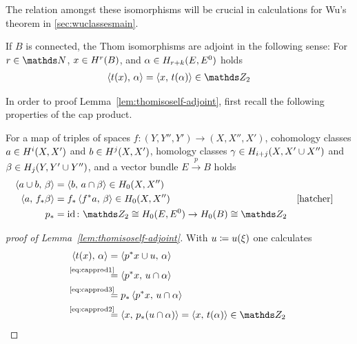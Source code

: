The relation amongst these isomorphisms will be crucial in
calculations for Wu's theorem in \autoref{sec:wuclassesmain}.
\begin{Lem}\label{lem:thomisoself-adjoint}
  If $B$ is connected, the Thom isomorphisms are adjoint in the
  following sense:
  For $r\in\Nat$, $x\in H^r(B)$,
  and $\alpha\in H_{r+k}(E, {E}^0)$  holds 
  \begin{gather*}
    \capped{t(x)}{\alpha} = \capped{x}{t(\alpha)} \in\Zmod2
  \end{gather*}
\end{Lem}
In order to proof Lemma~\ref{lem:thomisoself-adjoint},
first recall the following properties of the cap product.
\begin{Rem}
  For
  a map of triples of spaces
  $f\colon (Y,Y'',Y')\to (X,X'',X')$,
  cohomology classes
  $a\in H^i(X,X')$ and $b\in H^j(X,X')$,
  homology classes
  $\gamma\in H_{i+j}(X, X'\cup X'')$
  and
  $\beta\in H_j(Y, Y'\cup Y'')$,
  and a vector bundle $E\xrightarrow{p}B$
  holds
  \begin{align}
    \label{eq:capprod1}
    \capped{a\cup b}{\beta} &= \capped{b}{a\cap\beta}
                              \in \H_0(X,X'')\\
    \label{eq:capprod2}
    \capped{a}{\pf f \beta} &= \pf f \capped{\pb f a}{\beta}
                              \in \H_0(X,X'')
                            &&\text{\cite[Chap.~3.3.2, p.\,241]{hatcher}}\\
    \label{eq:capprod3}
    \pf p &= \Id \colon
    \Zmod2\cong \H_0(\thomspacepair{E})\to \H_0(B)\cong\Zmod2
  \end{align}
\end{Rem}
\begin{proof}[proof of Lemma~\ref{lem:thomisoself-adjoint}]
  With $u\coloneqq{u}(\xi)$ one calculates
  \begin{align*}
    \capped{t(x)}{\alpha}
    &= \capped{\pb p x \cup \U}{\alpha} \\
    &\equalsby{\eqref{eq:capprod1}}
      \capped{\pb p x}{\U\cap\alpha} \\
    &\equalsby{\eqref{eq:capprod3}}
      \pf p\capped{\pb p x}{\U\cap\alpha} \\
    &\equalsby{\eqref{eq:capprod2}}
      \capped{x}{\pf p(u\cap\alpha)}
      = \capped{x}{\thomiso (\alpha)} \in\Zmod2
      \qedhere
  \end{align*}
\end{proof}

